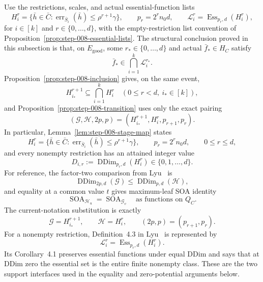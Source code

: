 Use the restrictions, scales, and actual essential-function lists
\[
 H_i^r
 =\{\bar h\in\bar C:
       \operatorname{err}_{\bar S_i}(\bar h)
       \leq\rho^{r+1}\gamma\},
 \qquad
 p_r=2^rn_0d,
 \qquad
 \mathcal L_i^r=\operatorname{Ess}_{p_r,d}(H_i^r),
\tag{1}
\]
for \(i\in[k]\) and \(r\in\{0,\ldots,d\}\), with the empty-restriction
list convention of Proposition~\ref{prop:step-008-essential-lists}.  The
structural conclusion proved in this subsection is that, on
\(E_{\mathrm{good}}\), some \(r_*\in\{0,\ldots,d\}\) and actual
\(\bar f_*\in H_C\) satisfy
\[
 \bar f_*\in\bigcap_{i=1}^k\mathcal L_i^{r_*}.
\tag{2}
\]
Proposition~\ref{prop:step-008-inclusion} gives, on the same event,
\[
 H_{i_*}^{r+1}\subseteq\bigcap_{i=1}^kH_i^r
 \quad(0\leq r<d,\ i_*\in[k]),
\tag{3}
\]
and Proposition~\ref{prop:step-008-transition} uses only the exact pairing
\[
 (\mathcal G,\mathcal H,2p,p)
 =(H_{i_*}^{r+1},H_i^r,p_{r+1},p_r).
\tag{4}
\]
In particular, Lemma~\ref{lem:step-008-stage-map} states
\[
 H_i^r
 =\{\bar h\in\bar C:
       \operatorname{err}_{\bar S_i}(\bar h)
       \leq\rho^{r+1}\gamma\},
 \qquad
 p_r=2^rn_0d,
 \qquad 0\le r\le d,
\tag{5}
\]
and every nonempty restriction has an attained integer value
\[
 D_{i,r}:=\operatorname{DDim}_{p_r,d}(H_i^r)
 \in\{0,1,\ldots,d\}.
\tag{6}
\]
For reference, the factor-two comparison from
Lyu~\citep{lyu2025} is
\[
 \operatorname{DDim}_{2p,d}(\mathcal G)
 \leq\operatorname{DDim}_{p,d}(\mathcal H),
\tag{7}
\]
and equality at a common value \(t\) gives maximum-leaf SOA identity
\[
 \operatorname{SOA}_{\mathcal H_u}
 =\operatorname{SOA}_{\mathcal G_v}
 \quad\text{as functions on }Q_C.
\tag{8}
\]
The current-notation substitution is exactly
\[
 \mathcal G=H_{i_*}^{r+1},\qquad
 \mathcal H=H_i^r,\qquad
 (2p,p)=(p_{r+1},p_r).
\tag{9}
\]
For a nonempty restriction, Definition~4.3 in
Lyu~\citep{lyu2025} is represented by
\[
 \mathcal L_i^r=\operatorname{Ess}_{p_r,d}(H_i^r).
\tag{10}
\]
Its Corollary~4.1 preserves essential functions under equal DDim and says
that at DDim zero the essential set is the entire finite nonempty class.
These are the two support interfaces used in the equality and zero-potential
arguments below.

